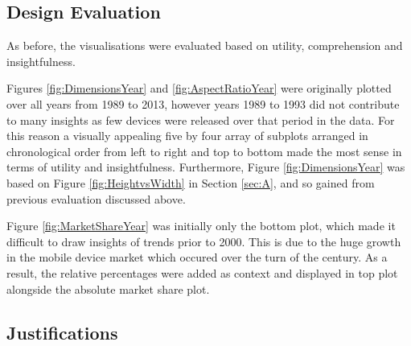 \documentclass[conference]{IEEEtran}
\begin{document}
\subsection{Design Evaluation}

As before, the visualisations were evaluated based on utility, comprehension
and insightfulness.

Figures \ref{fig:DimensionsYear} and \ref{fig:AspectRatioYear} were
originally plotted over all years from 1989 to 2013, however years 1989 to 1993
did not contribute to many insights as few devices were released over that
period in the data. For this reason a visually appealing five by four array of
subplots arranged in chronological order from left to right and top to bottom
made the most sense in terms of utility and insightfulness. Furthermore,
Figure \ref{fig:DimensionsYear} was based on Figure \ref{fig:HeightvsWidth} in
Section \ref{sec:A}, and so gained from previous evaluation discussed above.


Figure \ref{fig:MarketShareYear} was initially only the bottom plot, which
made it difficult to draw insights of trends prior to 2000. This is due to the
huge growth in the mobile device market which occured over the turn of the
century. As a result, the relative percentages were added as context and
displayed in top plot alongside the absolute market share plot.


\subsection{Justifications}
\end{document}
